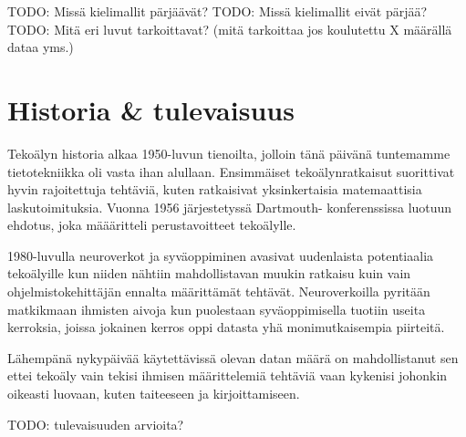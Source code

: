 TODO: Missä kielimallit pärjäävät?
TODO: Missä kielimallit eivät pärjää?
TODO: Mitä eri luvut tarkoittavat? (mitä tarkoittaa jos koulutettu X määrällä dataa yms.)

\section{Historia \& tulevaisuus}

Tekoälyn historia alkaa 1950-luvun tienoilta, jolloin tänä päivänä tuntemamme
tietotekniikka oli vasta ihan alullaan. Ensimmäiset tekoälynratkaisut
suorittivat hyvin rajoitettuja tehtäviä, kuten ratkaisivat yksinkertaisia
matemaattisia laskutoimituksia. Vuonna 1956 järjestetyssä Dartmouth-
konferenssissa luotuun ehdotus, joka määäritteli perustavoitteet tekoälylle.
\parencite{alma9911564814005973}

1980-luvulla neuroverkot ja syväoppiminen avasivat uudenlaista potentiaalia
tekoälyille kun niiden nähtiin mahdollistavan muukin ratkaisu kuin vain
ohjelmistokehittäjän ennalta määrittämät tehtävät. Neuroverkoilla pyritään
matkikmaan ihmisten aivoja kun puolestaan syväoppimisella tuotiin useita
kerroksia, joissa jokainen kerros oppi datasta yhä monimutkaisempia piirteitä.
\parencite{alma9911564814005973}

Lähempänä nykypäivää käytettävissä olevan datan määrä on mahdollistanut sen
ettei tekoäly vain tekisi ihmisen määrittelemiä tehtäviä vaan kykenisi johonkin
oikeasti luovaan, kuten taiteeseen ja kirjoittamiseen.
\parencite{alma9911564814005973}

TODO: tulevaisuuden arvioita?
